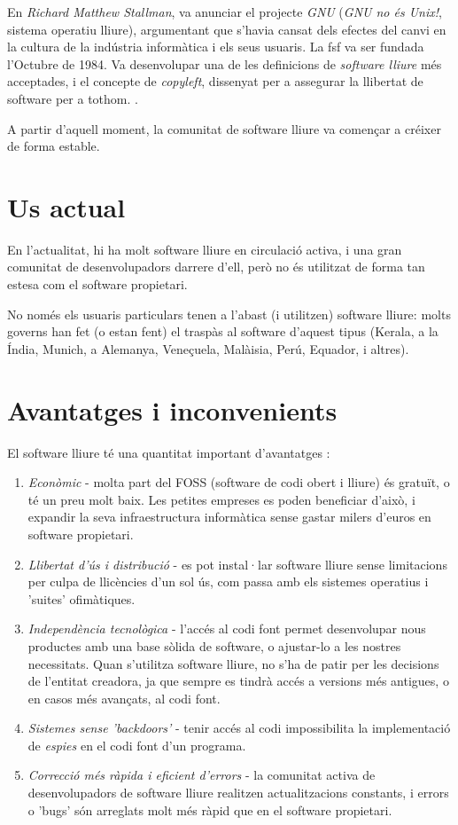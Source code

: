 En \emph{Richard Matthew Stallman}, va anunciar el projecte \emph{GNU} (\emph{GNU no és Unix!}, sistema operatiu lliure), argumentant que s'havia cansat dels efectes del canvi en la cultura de la indústria informàtica i els seus usuaris. La \ac{fsf} va ser fundada l'Octubre de 1984. Va desenvolupar una de les definicions de \emph{software lliure} més acceptades, i el concepte de \emph{copyleft}, dissenyat per a assegurar la llibertat de software per a tothom. \cite{fossieee}.

A partir d'aquell moment, la comunitat de software lliure va començar a créixer de forma estable.

\section{Us actual}

En l'actualitat, hi ha molt software lliure en circulació activa, i una gran comunitat de desenvolupadors darrere d'ell, però no és utilitzat de forma tan estesa com el software propietari.

No només els usuaris particulars tenen a l'abast (i utilitzen) software lliure: molts governs han fet (o estan fent) el traspàs al software d'aquest tipus (Kerala, a la Índia, Munich, a Alemanya, Veneçuela, Malàisia, Perú, Equador, i altres). \cite{fossadopters}

\section{Avantatges i inconvenients}

El software lliure té una quantitat important d'avantatges  \cite{fossadvantages}:

\begin{enumerate}
\item \emph{Econòmic} - molta part del FOSS (software de codi obert i lliure) és gratuït, o té un preu molt baix. Les petites empreses es poden beneficiar d'això, i expandir la seva infraestructura informàtica sense gastar milers d'euros en software propietari.
\item \emph{Llibertat d'ús i distribució} - es pot instal·lar software lliure sense limitacions per culpa de llicències d'un sol ús, com passa amb els sistemes operatius i 'suites' ofimàtiques.
\item \emph{Independència tecnològica} - l'accés al codi font permet desenvolupar nous productes amb una base sòlida de software, o ajustar-lo a les nostres necessitats. Quan s'utilitza software lliure, no s'ha de patir per les decisions de l'entitat creadora, ja que sempre es tindrà accés a versions més antigues, o en casos més avançats, al codi font.
\item \emph{Sistemes sense 'backdoors'} - tenir accés al codi impossibilita la implementació de \emph{espies} en el codi font d'un programa.
\item \emph{Correcció més ràpida i eficient d'errors} - la comunitat activa de desenvolupadors de software lliure realitzen actualitzacions constants, i errors o 'bugs' són arreglats molt més ràpid que en el software propietari.
\end{enumerate}

